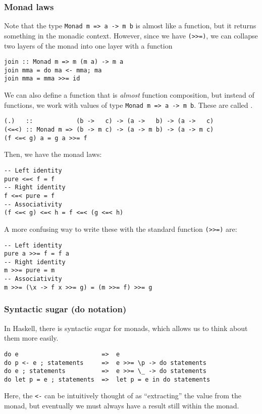 \documentclass[class=scrartcl]{standalone}
\begin{document}
\subsubsection{Monad laws}
Note that the type \texttt{Monad m => a -> m b}
is almost like a function, but it returns something in the monadic context.
However, since we have \texttt{(>>=)}, we can
collapse two layers of the monad into one layer with a function
\begin{verbatim}
join :: Monad m => m (m a) -> m a
join mma = do ma <- mma; ma
join mma = mma >>= id
\end{verbatim}
We can also define a function that is \emph{almost} function composition,
but instead of functions, we work with values of type
\texttt{Monad m => a -> m b}.
These are called .
\begin{verbatim}
(.)   ::            (b ->   c) -> (a ->   b) -> (a ->   c)
(<=<) :: Monad m => (b -> m c) -> (a -> m b) -> (a -> m c)
(f <=< g) a = g a >>= f
\end{verbatim}

Then, we have the monad laws:
\begin{verbatim}
-- Left identity
pure <=< f = f
-- Right identity
f <=< pure = f
-- Associativity
(f <=< g) <=< h = f <=< (g <=< h)
\end{verbatim}
A more confusing way to write these with the standard function
\texttt{(>>=)} are:
\begin{verbatim}
-- Left identity
pure a >>= f = f a
-- Right identity
m >>= pure = m
-- Associativity
m >>= (\x -> f x >>= g) = (m >>= f) >>= g
\end{verbatim}

\subsubsection{Syntactic sugar (do notation)}
In Haskell, there is syntactic sugar for monads,
which allows us to think about them more easily.
\begin{verbatim}
do e                       =>  e
do p <- e ; statements     =>  e >>= \p -> do statements
do e ; statements          =>  e >>= \_ -> do statements
do let p = e ; statements  =>  let p = e in do statements
\end{verbatim}
Here, the \texttt{<-} can be intuitively thought
of as ``extracting'' the value from the monad,
but eventually we must always have a result still within the monad.
\end{document}
